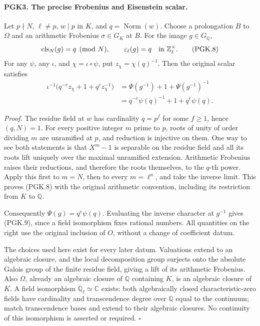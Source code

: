 \documentclass[11pt,a4paper]{article}
\numberwithin{equation}{section}
\theoremstyle{remark}\newtheorem{remark}[theorem]{Remark}
\begin{document}
\paragraph{PGK3. The precise Frobenius and Eisenstein scalar.}
\label{claim:PGK3}
Let \(p\nmid N\), \(\ell\ne p\), \(w\mid p\) in \(K\), and
\(q=\operatorname{Norm}(w)\). Choose a prolongation \(B\) to
\(\Omega\) and an arithmetic Frobenius \(\sigma\in G_K\) at
\(B\). For the image \(g\in G_{\mathbb Q}\),
\[
 \operatorname{cls}_N(g)=q\pmod N,\qquad
           \varepsilon_\ell(g)=q\quad\hbox{in }\mathbb Z_\ell^\times.
 \tag{PGK.8}
\]
For any \(\psi\), any \(\iota\), and
\(\chi=\iota\circ\psi\), put \(z_\chi=\chi(q)^{-1}\).
Then the original scalar satisfies
\[
 \begin{split}
 \iota^{-1}\bigl(q^{-e}z_\chi+1+q^ez_\chi^{-1}\bigr)
 &=\Psi(g^{-1})+1+\Psi(g^{-1})^{-1}\\
 &=q^{-e}\psi(q)^{-1}+1+q^e\psi(q).
 \end{split}                                                     \tag{PGK.9}
\]

\emph{Proof.}
The residue field at \(w\) has cardinality \(q=p^f\) for
some \(f\ge1\), hence \((q,N)=1\). For every positive integer
\(m\) prime to \(p\), roots of unity of order dividing \(m\)
are unramified at \(p\), and reduction is injective on them.
One way to see both statements is that \(X^m-1\) is separable
on the residue field and all its roots lift uniquely over the
maximal unramified extension. Arithmetic Frobenius raises
their reductions, and therefore the roots themselves, to
the \(q\)-th power. Apply this first to \(m=N\), then to
every \(m=\ell^a\), and take the inverse limit. This proves
(PGK.8) with the original arithmetic convention, including
its restriction from \(K\) to \(\mathbb Q\).

Consequently \(\Psi(g)=q^e\psi(q)\). Evaluating the
inverse character at \(g^{-1}\) gives (PGK.9), since a field
isomorphism fixes rational numbers. All quantities on the
right use the original inclusion of \(O\), without a change
of coefficient datum.

The choices used here exist for every later datum. Valuations
extend to an algebraic closure, and the local decomposition
group surjects onto the absolute Galois group of the finite
residue field, giving a lift of its arithmetic Frobenius.
Also \(\Omega\), already an algebraic closure of \(\mathbb Q\)
containing \(K\), is an algebraic closure of \(K\). A field
isomorphism \(\overline{\mathbb Q}_\ell\simeq\mathbb C\)
exists: both algebraically closed characteristic-zero fields
have cardinality and transcendence degree over \(\mathbb Q\)
equal to the continuum; match transcendence bases and extend
to their algebraic closures. No continuity of this isomorphism
is asserted or required. \hfill\(\square\)
\end{document}
